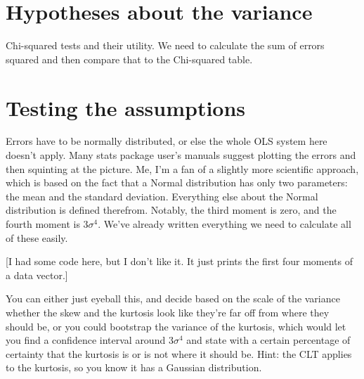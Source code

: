 \section{Hypotheses about the variance}
Chi-squared tests and their utility. We need to calculate the sum of errors squared 
and then compare that to the Chi-squared table. 


\section{Testing the assumptions} Errors have to be normally distributed, or else
the whole OLS system here doesn't apply. Many stats package user's manuals
suggest plotting the errors and then squinting at the picture. Me, I'm a
fan of a slightly more scientific approach, which is based on the fact
that a Normal distribution has only two parameters: the mean and the
standard deviation. Everything else about the Normal distribution is
defined therefrom. Notably, the third moment is zero, and the fourth
moment is $3 \sigma^4$. We've already written everything we need to calculate all of these easily.


[I had some code here, but I don't like it. It just prints the first four moments of a data vector.]

You can either just eyeball this, and decide based on the scale of the variance
whether the skew and the kurtosis look like they're far off from where they should
be, or you could bootstrap the variance of the kurtosis, which would let you find
a confidence interval around $3 \sigma^4$ and state with a certain percentage
of certainty that the kurtosis is or is not where it should be. Hint: the CLT applies to the kurtosis,
so you know it has a Gaussian distribution.

